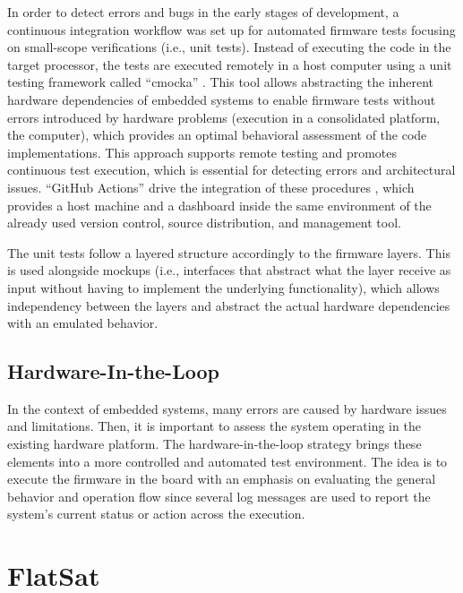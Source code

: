 In order to detect errors and bugs in the early stages of development, a continuous integration workflow was set up for automated firmware tests focusing on small-scope verifications (i.e., unit tests). Instead of executing the code in the target processor, the tests are executed remotely in a host computer using a unit testing framework called ``cmocka'' \cite{cmocka}. This tool allows abstracting the inherent hardware dependencies of embedded systems to enable firmware tests without errors introduced by hardware problems (execution in a consolidated platform, the computer), which provides an optimal behavioral assessment of the code implementations. This approach supports remote testing and promotes continuous test execution, which is essential for detecting errors and architectural issues. ``GitHub Actions'' drive the integration of these procedures \cite{gh-actions}, which provides a host machine and a dashboard inside the same environment of the already used version control, source distribution, and management tool.

The unit tests follow a layered structure accordingly to the firmware layers. This is used alongside mockups (i.e., interfaces that abstract what the layer receive as input without having to implement the underlying functionality), which allows independency between the layers and abstract the actual hardware dependencies with an emulated behavior.

\subsection{Hardware-In-the-Loop}

In the context of embedded systems, many errors are caused by hardware issues and limitations. Then, it is important to assess the system operating in the existing hardware platform. The hardware-in-the-loop strategy brings these elements into a more controlled and automated test environment. The idea is to execute the firmware in the board with an emphasis on evaluating the general behavior and operation flow since several log messages are used to report the system's current status or action across the execution.


\section{FlatSat}

